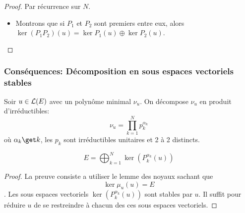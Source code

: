 \begin{proof}
	Par récurrence sur $N$.

	\begin{itemize}
		\item Montrons que si $P_1$ et $P_2$ sont premiers entre eux, alors $\ker (P_1P_2) (u) = \ker P_1(u) \oplus \ker P_2(u)$.\\
	\end{itemize}
\end{proof}


\subsubsection{Conséquences: Décomposition en sous espaces vectoriels stables}


Soir $u \in \mathcal{L}(E)$ avec un polynôme minimal $\nu_u$. On décompose $\nu_u$ en produit
d'irréductibles:
$$ \nu_u = \prod\limits_{k=1}^N p_k^{\alpha_k} $$
où $\alpha_k \get k$, les $p_k$ sont irréductibles unitaires et 2 à 2 distincts.


\begin{coro}
	$$E = \bigoplus_{k=1}^N \ker\left( {P_k^{\alpha_k}(u)} \right)$$
\end{coro}

\begin{proof}
La preuve consiste a utiliser le lemme des noyaux sachant que 
$$\ker \mu_u(u) = E $$
. Les sous espaces vectoriels  $\ker\left( {P_k^{\alpha_k}(u)} \right)$ sont stables par $u$.
Il suffit pour réduire $u$ de se restreindre à chacun des ces sous espaces vectoriels.
\end{proof}



